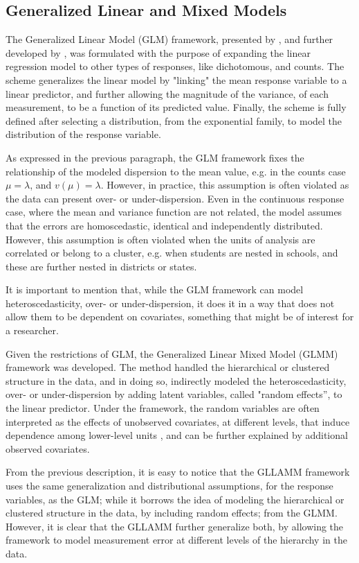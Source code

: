 \subsection{Generalized Linear and Mixed Models}

The Generalized Linear Model (GLM) framework, presented by \citet{Nelder_et_al_1972}, and further developed by \citet{Nelder_et_al_1989}, was formulated with the purpose of expanding the linear regression model to other types of responses, like dichotomous, and counts. The scheme generalizes the linear model by "linking" the mean response variable to a linear predictor, and further allowing the magnitude of the variance, of each measurement, to be a function of its predicted value. Finally, the scheme is fully defined after selecting a distribution, from the exponential family, to model the distribution of the response variable.

As expressed in the previous paragraph, the GLM framework fixes the relationship of the modeled dispersion to the mean value, e.g. in the counts case $\mu = \lambda$, and $v(\mu) = \lambda$. However, in practice, this assumption is often violated as the data can present over- or under-dispersion. Even in the continuous response case, where the mean and variance function are not related, the model assumes that the errors are homoscedastic, identical and independently distributed. However, this assumption is often violated when the units of analysis are correlated or belong to a cluster, e.g. when students are nested in schools, and these are further nested in districts or states.

It is important to mention that, while the GLM framework can model heteroscedasticity, over- or under-dispersion, it does it in a way that does not allow them to be dependent on covariates, something that might be of interest for a researcher.

Given the restrictions of GLM, the Generalized Linear Mixed Model (GLMM) framework was developed. The method handled the hierarchical or clustered structure in the data, and in doing so, indirectly modeled the heteroscedasticity, over- or under-dispersion by adding latent variables, called "random effects”, to the linear predictor. Under the framework, the random variables are often interpreted as the effects of unobserved covariates, at different levels, that induce dependence among lower-level units \cite{Rabe_et_al_2012}, and can be further explained by additional observed covariates. 

From the previous description, it is easy to notice that the GLLAMM framework uses the same generalization and distributional assumptions, for the response variables, as the GLM; while it borrows the idea of modeling the hierarchical or clustered structure in the data, by including random effects; from the GLMM. However, it is clear that the GLLAMM further generalize both, by allowing the framework to model measurement error at different levels of the hierarchy in the data.



